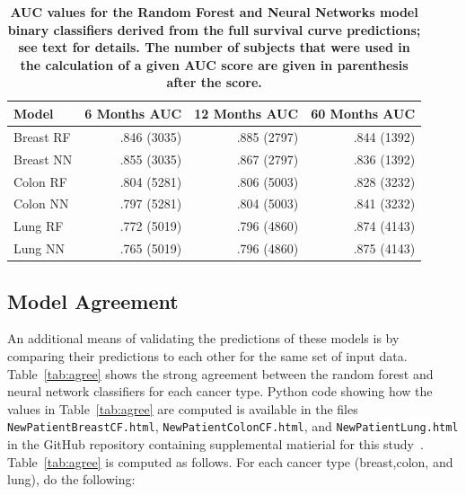 \documentclass[10pt,letterpaper]{article}
\newcommand{\codewhite}[1]{\colorbox{white}{\texttt{#1}}}
\begin{document}
\begin{table}[!ht]
\begin{adjustwidth}{-2.25in}{0in} %
\caption{\label{tab:AUC} {\bf AUC values for the Random Forest and Neural Networks model
binary classifiers derived from the full survival curve predictions; see text for details. The number of subjects that were used in the calculation of a given AUC score are given in parenthesis after the score. }}
\begin{tabular}{lrrr}
\toprule
Model & 6 Months AUC & 12 Months AUC & 60 Months AUC \\ 
\midrule
Breast RF &  .846  (3035)     &     .885  (2797)         &  .844 (1392) \\ 
Breast NN &   .855 (3035)    &     .867  (2797)    &    .836  (1392) \\ 
Colon RF  &     .804 (5281)         &      .806 (5003)          &      .828   (3232)        \\ 
Colon NN   &     .797 (5281)         &          .804 (5003)        &   .841 (3232) \\ 
Lung RF    &      .772  (5019)             &        .796 (4860)              &   .874 (4143)  \\ 
Lung NN    &        .765  (5019)            &        .796  (4860)             &  .875 (4143)  \\
\bottomrule
\end{tabular}
\end{adjustwidth}
\end{table}




\subsection*{Model Agreement}
\label{subsec:agreement}



An additional means of validating the predictions of these models is by comparing their predictions to each other for the same set of input data. 
Table~\ref{tab:agree} shows the strong agreement between the random forest and neural network classifiers for each cancer type. Python code showing how the values in Table~\ref{tab:agree} are computed is available in the files 
\codewhite{NewPatientBreastCF.html}, \codewhite{NewPatientColonCF.html}, and \codewhite{NewPatientLung.html} in the GitHub repository containing supplemental matierial for this study~\cite{supp}. Table~\ref{tab:agree} is computed as follows. 
For each cancer type (breast,colon, and lung), do the following:
\end{document}
